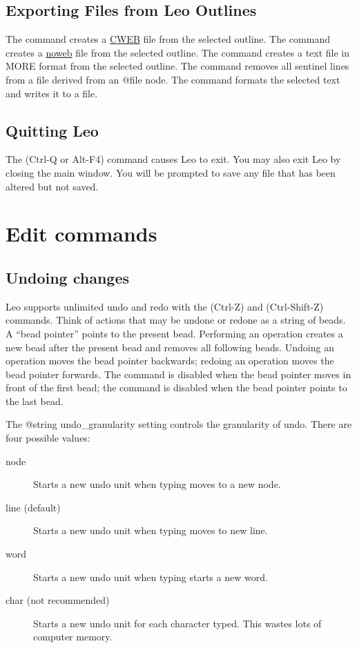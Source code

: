 \documentclass[a4paper,10pt,english]{sphinxmanual}
\begin{document}
\subsection{Exporting Files from Leo Outlines}
\label{commands:exporting-files-from-leo-outlines}
The  command creates a \href{http://www-cs-faculty.stanford.edu/~knuth/cweb.html}{CWEB} file from the selected
outline. The  command creates a \href{http://www.eecs.harvard.edu/~nr/noweb/}{noweb} file from the
selected outline. The  command creates a text file in
MORE format from the selected outline. The  command
removes all sentinel lines from a file derived from an @file node. The
 command formats the selected text and writes it to a file.


\subsection{Quitting Leo}
\label{commands:quitting-leo}
The  (Ctrl-Q or Alt-F4) command causes Leo to exit. You may
also exit Leo by closing the main window. You will be prompted to save any
file that has been altered but not saved.


\section{Edit commands}
\label{commands:edit-commands}

\subsection{Undoing changes}
\label{commands:undoing-changes}
Leo supports unlimited undo and redo with the  (Ctrl-Z) and
 (Ctrl-Shift-Z) commands. Think of actions that may be undone or
redone as a string of beads. A ``bead pointer'' points to the present bead.
Performing an operation creates a new bead after the present bead and
removes all following beads. Undoing an operation moves the bead pointer
backwards; redoing an operation moves the bead pointer forwards. The 
command is disabled when the bead pointer moves in front of the first bead;
the  command is disabled when the bead pointer points to the last bead.

The @string undo\_granularity setting controls the granularity of undo.
There are four possible values:
\begin{description}
\item[{node}] \leavevmode
Starts a new undo unit when typing moves to a new node.

\item[{line (default)}] \leavevmode
Starts a new undo unit when typing moves to new line.

\item[{word}] \leavevmode
Starts a new undo unit when typing starts a new word.

\item[{char (not recommended)}] \leavevmode
Starts a new undo unit for each character typed.
This wastes lots of computer memory.

\end{description}
\end{document}
